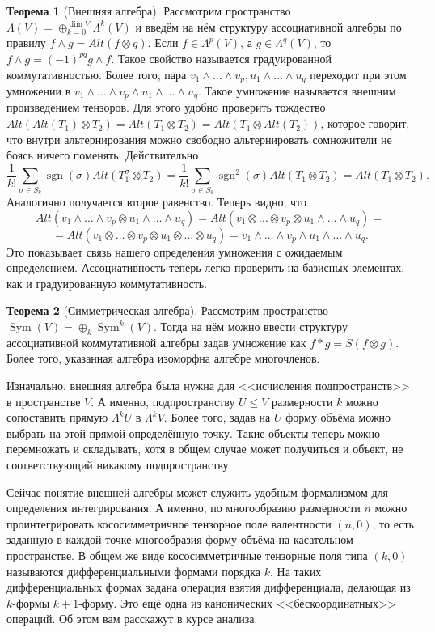 \documentclass[12pt,a4paper,oneside]{book}
\theoremstyle{definition}
\newtheorem{thm}{\color{red!40!black}Теорема}
\renewcommand{\leq}{\leqslant}
\newcommand{\Sym}{\operatorname{Sym}}
\newcommand{\sgn}{\operatorname{sgn}}
\def\thrm{\begin{thm}}
\def\ethrm{\end{thm}}
\begin{document}
\thrm[Внешняя алгебра] Рассмотрим пространство $\Lambda(V)=\oplus_{k=0}^{\dim V} \Lambda^k(V)$ и введём на нём структуру ассоциативной алгебры по правилу $ f\wedge g= Alt(f\otimes g)$. Если $f\in \Lambda^p(V)$, а $g \in \Lambda^q(V)$, то $f\wedge g=(-1)^{pq}g \wedge f$. Такое свойство называется градуированной коммутативностью. Более того, пара $v_1 \wedge \dots \wedge v_p , u_1\wedge \dots \wedge u_q$ переходит при этом умножении в $v_1 \wedge \dots \wedge v_p \wedge u_1\wedge \dots \wedge u_q$. Такое умножение называется внешним произведением тензоров.
\proof Для этого удобно проверить тождество $Alt(Alt(T_1)\otimes T_2)= Alt(T_1\otimes T_2)= Alt(T_1 \otimes Alt(T_2))$, которое говорит, что внутри альтернирования можно свободно альтернировать сомножители не боясь ничего поменять. Действительно
$$\frac{1}{k!}\sum_{\sigma \in S_{k}}\sgn(\sigma) Alt(T_1^{\sigma}\otimes T_2)=\frac{1}{k!}\sum_{\sigma \in S_{k}} \sgn^2(\sigma) Alt(T_1\otimes T_2)=Alt(T_1 \otimes T_2).$$
Аналогично получается второе равенство. Теперь видно, что 
$$Alt(v_1 \wedge \dots \wedge v_p \otimes u_1\wedge \dots \wedge u_q)=Alt(v_1 \otimes \dots \otimes v_p \otimes u_1\wedge \dots \wedge u_q)=$$
$$=Alt( v_1 \otimes \dots \otimes v_p \otimes u_1\otimes \dots \otimes u_q) =v_1 \wedge \dots \wedge v_p  \wedge u_1\wedge \dots \wedge u_q .$$
Это показывает связь нашего определения умножения с ожидаемым определением. Ассоциативность теперь легко проверить на базисных элементах, как и градуированную коммутативность.
\endproof
\ethrm





\thrm[Симметрическая алгебра] Рассмотрим пространство $\Sym(V)=\oplus_k \Sym^k(V)$. Тогда на нём можно ввести структуру ассоциативной коммутативной алгебры задав умножение как $ f*g= S(f\otimes g)$. Более того, указанная алгебра изоморфна алгебре многочленов.
\ethrm



Изначально, внешняя алгебра была нужна для <<исчисления подпространств>> в пространстве $V$. А именно, подпространству $U\leq V$ размерности $k$ можно сопоставить прямую $\Lambda^k U$ в $\Lambda^k V$. Более того, задав на $U$ форму объёма можно выбрать на этой прямой определённую точку. Такие объекты теперь можно перемножать и складывать, хотя в общем случае может получиться и объект, не соответствующий никакому подпространству. 

Сейчас понятие внешней алгебры может служить удобным формализмом для определения интегрирования. А именно, по многообразию размерности $n$ можно проинтегрировать кососимметричное тензорное поле валентности $(n,0)$, то есть заданную в каждой точке многообразия форму объёма на касательном пространстве. В общем же виде кососимметричные тензорные поля типа $(k,0)$ называются дифференциальными формами порядка $k$. На таких дифференциальных формах задана операция взятия дифференциала, делающая из $k$-формы $k+1$-форму. Это ещё одна из канонических <<бескоординатных>> операций. Об этом вам расскажут в курсе анализа.
\end{document}
